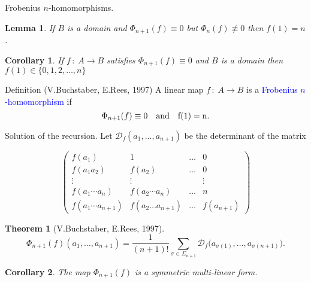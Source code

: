 \documentclass{beamer}
\newtheorem{thm}{Theorem}
\newtheorem{cor}{Corollary}
\newtheorem{lem}{Lemma}
\def\blue#1{\textcolor{blue}{#1}}
\begin{document}
\begin{frame}{Frobenius $n$-homomorphisms.}
\begin{lem}
If $B$ is a domain and $\Phi_{n+1}(f)\equiv 0$ but
$\Phi_n(f)\not \equiv 0$ then $f(1)=n$.
\end{lem}
\begin{cor}
If $f\,:\;A\rightarrow B$ satisfies $\Phi_{n+1}(f)\equiv 0$ and
$B$ is a domain then $f(1)\in\{0,1,2,\ldots,n\}$
\end{cor}
\begin{block}{Definition (V.Buchstaber, E.Rees, 1997)}
A linear map  $f\,:\;A\rightarrow B$ is a \blue{Frobenius $n$-homomorphism} if
\[
\Phi_{n+1}(f)\equiv 0 \quad  \rm{and} \quad f(1)=n.
\]
\end{block}
\end{frame}








\begin{frame}{Solution of the recursion.}
Let ${\mathcal D}_f(a_1,\ldots,a_{n+1})$ be the determinant of the matrix
\vspace{-0.4cm}

\bigskip
\[
\left(\begin{array}{llll}
 f(a_1)&1&\ldots&0 \\
  f(a_1a_2)&f(a_2)&\ldots&0\\
  \vdots&\vdots&&\vdots\\
  f(a_1\cdots a_n)&f(a_2\cdots a_n)&\ldots&n\\
   f(a_1\cdots a_{n+1})&f(a_2\ldots a_{n+1})&\ldots&f(a_{n+1})
  \end{array}\right)
  \]
\begin{thm}[V.Buchstaber, E.Rees, 1997]
\vspace{-0.3cm}

\[
\Phi_{n+1}(f)(a_1,\ldots,a_{n+1})=\frac{1}{(n+1)!}\sum\limits_{\sigma\in\Sigma_{n+1}}
{\mathcal D}_f\big(a_{\sigma(1)},\ldots,a_{\sigma(n+1)}\big).
\]
\end{thm}
\begin{cor}
The map $\Phi_{n+1}(f)$ is a symmetric multi-linear form.
\end{cor}
\end{frame}
\end{document}
